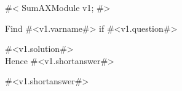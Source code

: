 

#<
SumAXModule v1;
#>

Find #<v1.varname#> if #<v1.question#>

#<v1.solution#> \\[1.8mm]
Hence #<v1.shortanswer#>

#<v1.shortanswer#>


